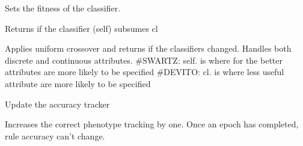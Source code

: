 \documentclass[letterpaper,10pt,english]{sphinxmanual}
\begin{document}
\begin{fulllineitems}
\begin{fulllineitems}
\label{\detokenize{eLCS:eLCS.Classifier.Classifier.setFitness}}
Sets the fitness of the classifier.

\end{fulllineitems}


\begin{fulllineitems}
\label{\detokenize{eLCS:eLCS.Classifier.Classifier.subsumes}}
Returns if the classifier (self) subsumes cl

\end{fulllineitems}


\begin{fulllineitems}
\label{\detokenize{eLCS:eLCS.Classifier.Classifier.uniformCrossover}}
Applies uniform crossover and returns if the classifiers changed. Handles both discrete and continuous attributes.  
\#SWARTZ: self. is where for the better attributes are more likely to be specified
\#DEVITO: cl. is where less useful attribute are more likely to be specified

\end{fulllineitems}


\begin{fulllineitems}
\label{\detokenize{eLCS:eLCS.Classifier.Classifier.updateAccuracy}}
Update the accuracy tracker

\end{fulllineitems}


\begin{fulllineitems}
\label{\detokenize{eLCS:eLCS.Classifier.Classifier.updateCorrect}}
Increases the correct phenotype tracking by one. Once an epoch has completed, rule accuracy can’t change.

\end{fulllineitems}


\end{fulllineitems}
\end{document}
